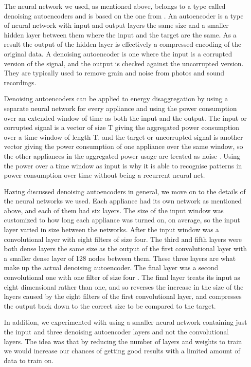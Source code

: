 \documentclass{article}
\begin{document}
The neural network we used, as mentioned above, belongs to a type called denoising autoencoders and is based on the one from \cite{Kelly}. An autoencoder is a type of neural network with input and output layers the same size and a smaller hidden layer between them where the input and the target are the same. As a result the output of the hidden layer is effectively a compressed encoding of the original data. A denoising autoencoder is one where the input is a corrupted version of the signal, and the output is checked against the uncorrupted version. They are typically used to remove grain and noise from photos and sound recordings. 

Denoising autoencoders can be applied to energy disaggregation by using a separate neural network for every appliance and using the power consumption over an extended window of time as both the input and the output. The input or corrupted signal is a vector of size T giving the aggregated power consumption over a time window of length T, and the target or uncorrupted signal is another vector giving the power consumption of one appliance over the same window, so the other appliances in the aggregated power usage are treated as noise \cite{Kelly}. Using the power over a time window as input is why it is able to recognise patterns in power consumption over time without being a recurrent neural net.

Having discussed denoising autoencoders in general, we move on to the details of the neural networks we used. Each appliance had its own network as mentioned above, and each of them had six layers. The size of the input window was customized to how long each appliance was turned on, on average, so the input layer varied in size between the networks. After the input window was a convolutional layer with eight filters of size four. The third and fifth layers were both dense layers the same size as the output of the first convolutional layer with a smaller dense layer of 128 nodes between them. These three layers are what make up the actual denoising autoencoder. The final layer was a second convolutional one with one filter of size four \cite{Kelly}. The final layer treats its input as eight dimensional rather than one, and so reverses the increase in the size of the layers caused by the eight filters of the first convolutional layer, and compresses the output back down to the correct size to be compared to the target.

In addition, we experimented with using a smaller neural network containing just the input and three denoising autoencoder layers and not the convolutional layers. The idea was that by reducing the number of layers and weights to train we would increase our chances of getting good results with a limited amount of data to train on.
\end{document}

